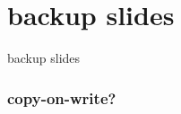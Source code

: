 \date{}
\title{}
\date{}

\begin{frame}
    \titlepage
\end{frame}





\section{backup slides}
\begin{frame}{backup slides}
\end{frame}


\subsubsection{copy-on-write?} %



